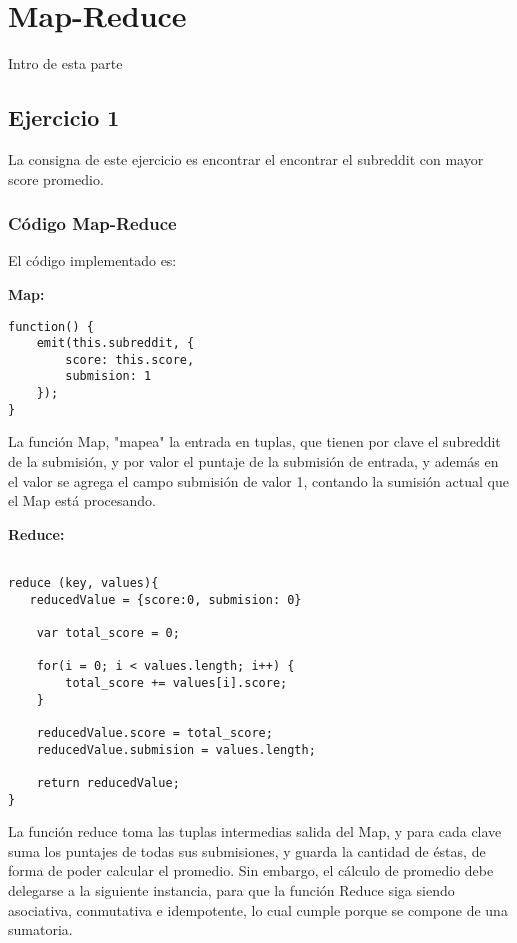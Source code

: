 \section{Map-Reduce}

Intro de esta parte

\subsection{Ejercicio 1}

La consigna de este ejercicio es encontrar el encontrar el subreddit con mayor score promedio.

\subsubsection{C\'odigo Map-Reduce}

El c\'odigo implementado es:

\textbf{Map:}

\begin{lstlisting}
function() {
    emit(this.subreddit, {
    	score: this.score,
    	submision: 1
    });
}

\end{lstlisting}

La funci\'on Map, "mapea"  la entrada en tuplas, que tienen por clave el subreddit de la submisi\'on, y por valor el puntaje de la submisi\'on de entrada, y adem\'as en el valor se agrega el campo submisi\'on de valor 1, contando la sumisi\'on actual que el Map est\'a procesando.

\vspace{2mm}

\textbf{Reduce:}

\begin{lstlisting}

reduce (key, values){
   reducedValue = {score:0, submision: 0}

    var total_score = 0;

	for(i = 0; i < values.length; i++) {
		total_score += values[i].score;
	}

	reducedValue.score = total_score;
	reducedValue.submision = values.length;

    return reducedValue;
}

\end{lstlisting}

La funci\'on reduce toma las tuplas intermedias salida del Map, y para cada clave suma los puntajes de todas sus submisiones, y guarda la cantidad de \'estas, de forma de poder calcular el promedio. Sin embargo, el c\'alculo de promedio debe delegarse a la siguiente instancia, para que la funci\'on Reduce siga siendo asociativa, conmutativa e idempotente, lo cual cumple porque se compone de una sumatoria.

